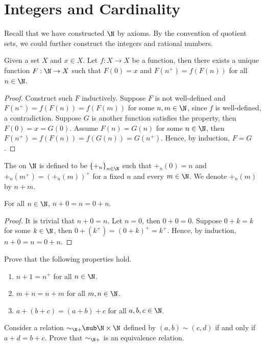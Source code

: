 \documentclass[10pt]{article}
\begin{document}
\section{Integers and Cardinality}
Recall that we have constructed $\N$ by axioms. By the convention of quotient sets, we could further construct the integers and rational numbers.
\begin{theorem}[recursion]
    Given a set $X$ and $x\in X$. Let $f:X\to X$ be a function, then there exists a unique function $F:\N\to X$ such that $F(0)=x$ and $F({n}^{+})=f(F(n))$ for all $n\in\N$.
\end{theorem}
\begin{proof}
    Construct such $F$ inductively. Suppose $F$ is not well-defined and $F({n}^{+})=f(F(n))=f(F(m))$ for some $n,m\in\N$, since $f$ is well-defined, a contradiction. Suppose $G$ is another function satisfies the property, then $F(0)=x=G(0)$. Assume $F(n)=G(n)$ for some $n\in\N$, then $F({n}^{+})=f(F(n))=f(G(n))=G({n}^{+})$. Hence, by induction, $F=G$.
\end{proof}
\begin{definition}
    The  on $\N$ is defined to be ${\{{+}_{n}\}}_{n\in\N}$ such that ${+}_{n}(0)=n$ and ${+}_{n}({m}^{+})={({+}_{n}(m))}^{+}$ for a fixed $n$ and every $m\in\N$. We denote ${+}_{n}(m)$ by $n+m$.
\end{definition}
\begin{proposition}
    For all $n\in\N$, $n+0=n=0+n$.
\end{proposition}
\begin{proof}
    It is trivial that $n+0=n$. Let $n=0$, then $0+0=0$. Suppose $0+k=k$ for some $k\in\N$, then $0+({k}^{+})={(0+k)}^{+}={k}^{+}$. Hence, by induction, $n+0=n=0+n$.
\end{proof}
\begin{problem}
    Prove that the following properties hold.
    \begin{enumerate}
        \item $n+1={n}^{+}$ for all $n\in\N$.
        \item $m+n=n+m$ for all $m,n\in\N$.
        \item $a+(b+c)=(a+b)+c$ for all $a,b,c\in\N$.
    \end{enumerate}
\end{problem}
\begin{problem}
    Consider a relation ${\sim}_{\N+}\sub\N\times\N$ defined by $(a,b)\sim(c,d)$ if and only if $a+d=b+c$. Prove that ${\sim}_{\N+}$ is an equivalence relation.
\end{problem}
\end{document}
